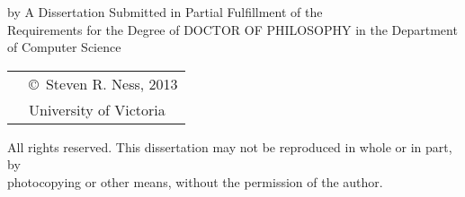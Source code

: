 \pagebreak
{
\centering
\thesistitle
\tpbreak
by
\tpbreak
\nameanddegrees
\tpbreak
A Dissertation Submitted in Partial Fulfillment of the \\
Requirements for the Degree of
\tpbreak
DOCTOR OF PHILOSOPHY
\tpbreak
in the Department of Computer Science\\
\vfill
\begin{tabular}{cl}
& \copyright\ Steven R. Ness, 2013\\
& \phantom{\copyright} University of Victoria
\end{tabular}
\tpbreak
All rights reserved. This dissertation may not be reproduced in whole or in part, by \\
\hfill photocopying or other means, without the permission of the author. 
\hfill
}
\pagebreak
